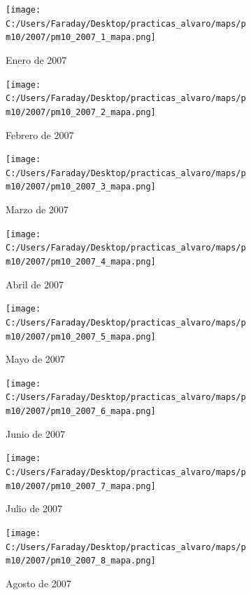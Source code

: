\documentclass[12pt]{article}
\begin{document}
\begin{figure}[H]
\centering
\begin{subfigure}[h]{0.45\textwidth}
\texttt{[image: C:/Users/Faraday/Desktop/practicas\_alvaro/maps/pm10/2007/pm10\_2007\_1\_mapa.png]}
\caption{Enero de 2007}
\label{fig:map-mon-3-1-2007}
\end{subfigure}
%
\begin{subfigure}[H]{0.45\textwidth}
\texttt{[image: C:/Users/Faraday/Desktop/practicas\_alvaro/maps/pm10/2007/pm10\_2007\_2\_mapa.png]}
\caption{Febrero de 2007}
\label{fig:map-mon-3-2-2007}
\end{subfigure}
\caption{}
\end{figure}

\begin{figure}[H]
\centering
\begin{subfigure}[h]{0.45\textwidth}
\texttt{[image: C:/Users/Faraday/Desktop/practicas\_alvaro/maps/pm10/2007/pm10\_2007\_3\_mapa.png]}
\caption{Marzo de 2007}
\label{fig:map-mon-3-3-2007}
\end{subfigure}
%
\begin{subfigure}[H]{0.45\textwidth}
\texttt{[image: C:/Users/Faraday/Desktop/practicas\_alvaro/maps/pm10/2007/pm10\_2007\_4\_mapa.png]}
\caption{Abril de 2007}
\label{fig:map-mon-3-4-2007}
\end{subfigure}
\caption{}
\end{figure}

\begin{figure}[H]
\centering
\begin{subfigure}[h]{0.45\textwidth}
\texttt{[image: C:/Users/Faraday/Desktop/practicas\_alvaro/maps/pm10/2007/pm10\_2007\_5\_mapa.png]}
\caption{Mayo de 2007}
\label{fig:map-mon-3-5-2007}
\end{subfigure}
%
\begin{subfigure}[H]{0.45\textwidth}
\texttt{[image: C:/Users/Faraday/Desktop/practicas\_alvaro/maps/pm10/2007/pm10\_2007\_6\_mapa.png]}
\caption{Junio de 2007}
\label{fig:map-mon-3-6-2007}
\end{subfigure}
\caption{}
\end{figure}

\newpage

\begin{figure}[H]
\centering
\begin{subfigure}[h]{0.45\textwidth}
\texttt{[image: C:/Users/Faraday/Desktop/practicas\_alvaro/maps/pm10/2007/pm10\_2007\_7\_mapa.png]}
\caption{Julio de 2007}
\label{fig:map-mon-3-7-2007}
\end{subfigure}
%
\begin{subfigure}[H]{0.45\textwidth}
\texttt{[image: C:/Users/Faraday/Desktop/practicas\_alvaro/maps/pm10/2007/pm10\_2007\_8\_mapa.png]}
\caption{Agosto de 2007}
\label{fig:map-mon-3-8-2007}
\end{subfigure}
\caption{}
\end{figure}
\end{document}
